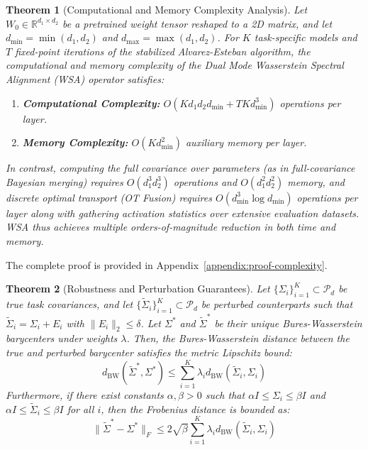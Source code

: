 \documentclass{article}
\theoremstyle{plain}
\newtheorem{theorem}{Theorem}[section]
\theoremstyle{definition}
\theoremstyle{remark}
\begin{document}
\begin{theorem}[Computational and Memory Complexity Analysis]
Let $W_0 \in \mathbb{R}^{d_1 \times d_2}$ be a pretrained weight tensor reshaped to a 2D matrix, and let $d_{\min} = \min(d_1, d_2)$ and $d_{\max} = \max(d_1, d_2)$. For $K$ task-specific models and $T$ fixed-point iterations of the stabilized Alvarez-Esteban algorithm, the computational and memory complexity of the Dual Mode Wasserstein Spectral Alignment (WSA) operator satisfies:
\begin{enumerate}
  \item \textbf{Computational Complexity:} $O(K d_1 d_2 d_{\min} + T K d_{\min}^3)$ operations per layer.
  \item \textbf{Memory Complexity:} $O(K d_{\min}^2)$ auxiliary memory per layer.
\end{enumerate}
In contrast, computing the full covariance over parameters (as in full-covariance Bayesian merging) requires $O(d_1^3 d_2^3)$ operations and $O(d_1^2 d_2^2)$ memory, and discrete optimal transport (OT Fusion) requires $O(d_{\min}^3 \log d_{\min})$ operations per layer along with gathering activation statistics over extensive evaluation datasets. WSA thus achieves multiple orders-of-magnitude reduction in both time and memory.
\end{theorem}

The complete proof is provided in Appendix~\ref{appendix:proof-complexity}.

\begin{theorem}[Robustness and Perturbation Guarantees]
\label{thm:robustness}
Let $\{\Sigma_i\}_{i=1}^K \subset \mathcal{P}_d$ be true task covariances, and let $\{\tilde{\Sigma}_i\}_{i=1}^K \subset \mathcal{P}_d$ be perturbed counterparts such that $\tilde{\Sigma}_i = \Sigma_i + E_i$ with $\|E_i\|_2 \le \delta$.
Let $\Sigma^*$ and $\tilde{\Sigma}^*$ be their unique Bures-Wasserstein barycenters under weights $\lambda$. Then, the Bures-Wasserstein distance between the true and perturbed barycenter satisfies the metric Lipschitz bound:
\begin{equation}
  d_{\text{BW}}(\tilde{\Sigma}^*, \Sigma^*) \le \sum_{i=1}^K \lambda_i d_{\text{BW}}(\tilde{\Sigma}_i, \Sigma_i)
\end{equation}
Furthermore, if there exist constants $\alpha, \beta > 0$ such that $\alpha I \le \Sigma_i \le \beta I$ and $\alpha I \le \tilde{\Sigma}_i \le \beta I$ for all $i$, then the Frobenius distance is bounded as:
\begin{equation}
  \|\tilde{\Sigma}^* - \Sigma^*\|_F \le 2 \sqrt{\beta} \sum_{i=1}^K \lambda_i d_{\text{BW}}(\tilde{\Sigma}_i, \Sigma_i)
\end{equation}
\end{theorem}
\end{document}
